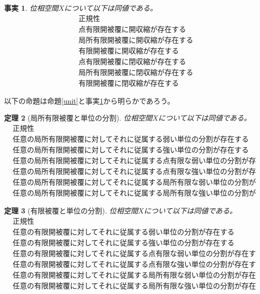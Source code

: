 \documentclass[leqno]{jsarticle}
\newtheorem{thm}{定理}
\newtheorem{fact}[thm]{事実}
\begin{document}
\setcounter{equation}{0}
\begin{fact}\label{fact}
位相空間$X$について以下は同値である。
\begin{align}
&\mbox{正規性}\\ 
&\mbox{点有限開被覆に開収縮が存在する}\\ 
&\mbox{局所有限開被覆に開収縮が存在する}\\ 
&\mbox{有限開被覆に開収縮が存在する}\\ 
&\mbox{点有限開被覆に閉収縮が存在する}\\
&\mbox{局所有限開被覆に閉収縮が存在する}\\  
&\mbox{有限開被覆に閉収縮が存在する}
\end{align}
\end{fact}
以下の命題は命題\ref{unit}と事実\ref{fact}から明らかであろう。
\setcounter{equation}{0}
\begin{thm}[局所有限被覆と単位の分割]
位相空間$X$について以下は同値である。
\begin{align}
&\mbox{正規性}\\
&\mbox{任意の局所有限開被覆に対してそれに従属する弱い単位の分割が存在する}\\ 
&\mbox{任意の局所有限開被覆に対してそれに従属する強い単位の分割が存在する}\\ 
&\mbox{任意の局所有限開被覆に対してそれに従属する点有限な弱い単位の分割が存在する}\\ 
&\mbox{任意の局所有限開被覆に対してそれに従属する点有限な強い単位の分割が存在する}\\ 
&\mbox{任意の局所有限開被覆に対してそれに従属する局所有限な弱い単位の分割が存在する}\\ 
&\mbox{任意の局所有限開被覆に対してそれに従属する局所有限な強い単位の分割が存在する}
\end{align}
\end{thm}
\setcounter{equation}{0}
\begin{thm}[有限被覆と単位の分割]
位相空間$X$について以下は同値である。
\begin{align}
&\mbox{正規性}\\
&\mbox{任意の有限開被覆に対してそれに従属する弱い単位の分割が存在する}\\ 
&\mbox{任意の有限開被覆に対してそれに従属する強い単位の分割が存在する}\\ 
&\mbox{任意の有限開被覆に対してそれに従属する点有限な弱い単位の分割が存在する}\\ 
&\mbox{任意の有限開被覆に対してそれに従属する点有限な強い単位の分割が存在する}\\ 
&\mbox{任意の有限開被覆に対してそれに従属する局所有限な弱い単位の分割が存在する}\\ 
&\mbox{任意の有限開被覆に対してそれに従属する局所有限な強い単位の分割が存在する}
\end{align}
\end{thm}
\end{document}

